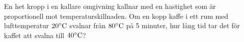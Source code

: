 \documentclass[11pt]{article}
\begin{document}
En het kropp i en kallare omgivning kallnar med en hastighet som är proportionell mot temperaturskillnaden. Om en kopp kaffe i ett rum med lufttemperatur $20\degree\mathrm{C}$ svalnar från $80\degree\mathrm{C}$ på 5 minuter, hur lång tid tar det för kaffet att svalna till $40\degree\mathrm{C}$?
\end{document}
